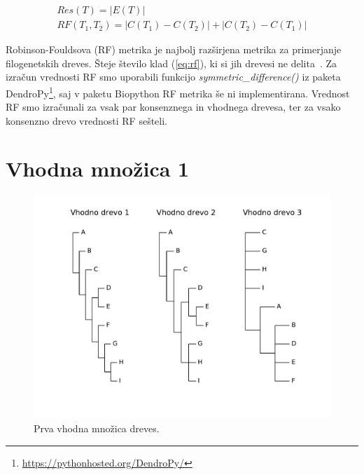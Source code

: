 \documentclass[a4paper, 12pt]{book}
\begin{document}
\begin{align}
	Res(T) = \left|E(T)\right| \label{eq:res} ~~~~~~~~~~~~~~~~~~~~~ \\
	RF(T_1, T_2) = \left|C(T_1) - C(T_2)\right| + \left|C(T_2) - C(T_1)\right|  \label{eq:rf}
\end{align}

Robinson-Fouldsova (RF) metrika je najbolj razširjena metrika za primerjanje filogenetskih dreves. Šteje število klad (\ref{eq:rf}), ki si jih drevesi ne delita~\cite{rf}. Za izračun vrednosti RF smo uporabili funkcijo {\it symmetric\_difference()} iz paketa DendroPy\footnote{\url{https://pythonhosted.org/DendroPy/}}, saj v paketu Biopython RF metrika še ni implementirana. Vrednost RF smo izračunali za vsak par konsenznega in vhodnega drevesa, ter za vsako konsenzno drevo vrednosti RF sešteli.

\section{Vhodna množica 1}
\begin{figure}[h!]
	\begin{center}
		\includegraphics[scale=0.45, clip=true, trim=1cm 2cm 1cm 0]{gfx/eval_input.pdf}
	\end{center}
	\caption{Prva vhodna množica dreves.}
	\label{img-eval-input}
\end{figure}
\end{document}
